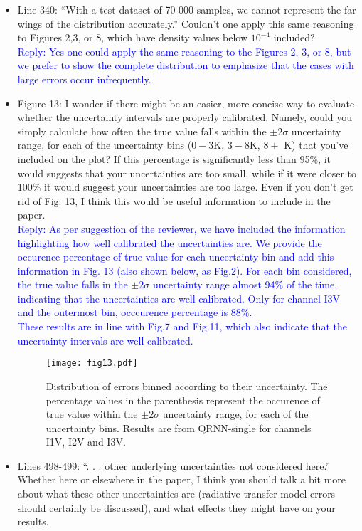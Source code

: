 \documentclass[11pt,a4paper]{article}
\begin{document}
\begin{itemize}
\item  
			Line 340: ``With a test dataset of 70 000 samples, we cannot represent the far wings of the distribution accurately.'' Couldn't one apply this same reasoning to Figures 2,3, or
			8, which have density values below $10^{-4}$ included?\\

\textcolor{blue}{Reply: Yes one could apply the same reasoning to the Figures 2, 3, or 8, but we prefer to show the complete distribution to emphasize that the cases with large errors occur infrequently.}\\


\item 
			Figure 13: I wonder if there might be an easier, more concise way to evaluate whether
			the uncertainty intervals are properly calibrated. Namely, could you simply calculate
			how often the true value falls within the $\pm2\sigma$ uncertainty range, for each of the uncertainty bins ($0 - 3$K, $3 - 8$K, $8 +$ K) that you've included on the plot? If this percentage is significantly less than 95\%, it would suggests that your uncertainties are too small, while if it were closer to 100\% it would suggest your uncertainties are too large. Even if you don't get rid of Fig. 13, I think this would be useful information to include in the paper.\\

\textcolor{blue}{Reply: As per suggestion of the reviewer, we have included the information highlighting how well calibrated the uncertainties are. We provide the occurence percentage of true value for each uncertainty bin and add this information in Fig. 13 (also shown below, as Fig.2). For each bin considered, the true value falls in the  $\pm2\sigma$ uncertainty range almost 94\% of the time, indicating that the uncertainties are well calibrated. Only for channel I3V and the outermost bin, occcurence percentage is 88\%. \\	
These results are in line with Fig.7 and Fig.11, which also indicate that the uncertainty intervals are well calibrated.} \\
\begin{figure}
	\centering
	\texttt{[image: fig13.pdf]}
	\caption{Distribution of errors binned according to their uncertainty. The percentage values in the parenthesis represent the occurence of true value within the $\pm2\sigma$ uncertainty range, for each of the uncertainty bins. Results are from QRNN-single for channels I1V, I2V and I3V.}
\end{figure}
\item  
			Lines 498-499: ``. . . other underlying uncertainties not considered here.'' Whether here or elsewhere in the paper, I think you should talk a bit more about what these other uncertainties are (radiative transfer model errors should certainly be discussed), and what effects they might have on your results.\\


\end{itemize}
\end{document}
